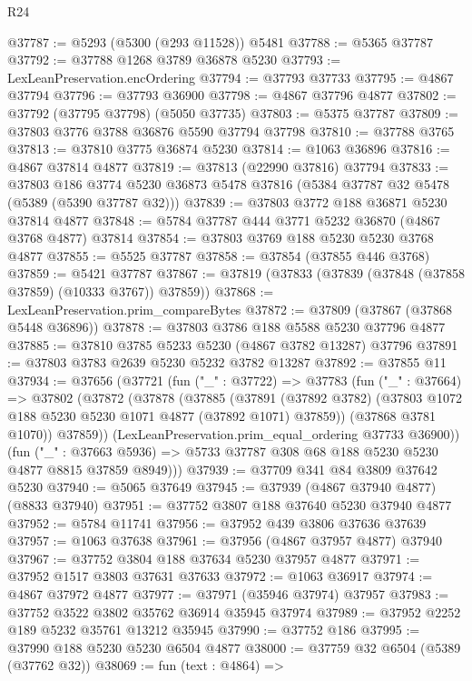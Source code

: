 \begin{lexlean}{R24}
\begin{coremodule}
@37787 := @5293 (@5300 (@293 @11528)) @5481
@37788 := @5365 @37787
@37792 := @37788 @1268 @3789 @36878 @5230
@37793 := LexLeanPreservation.encOrdering
@37794 := @37793 @37733
@37795 := @4867 @37794
@37796 := @37793 @36900
@37798 := @4867 @37796 @4877
@37802 := @37792 (@37795 @37798) (@5050 @37735)
@37803 := @5375 @37787
@37809 := @37803 @3776 @3788 @36876 @5590 @37794 @37798
@37810 := @37788 @3765
@37813 := @37810 @3775 @36874 @5230
@37814 := @1063 @36896
@37816 := @4867 @37814 @4877
@37819 := @37813 (@22990 @37816) @37794
@37833 := @37803
    @186
    @3774
    @5230
    @36873
    @5478
    @37816
    (@5384 @37787 @32 @5478 (@5389 (@5390 @37787 @32)))
@37839 := @37803 @3772 @188 @36871 @5230 @37814 @4877
@37848 := @5784 @37787 @444 @3771 @5232 @36870 (@4867 @3768 @4877) @37814
@37854 := @37803 @3769 @188 @5230 @5230 @3768 @4877
@37855 := @5525 @37787
@37858 := @37854 (@37855 @446 @3768)
@37859 := @5421 @37787
@37867 := @37819 (@37833 (@37839 (@37848 (@37858 @37859) (@10333 @3767)) @37859))
@37868 := LexLeanPreservation.prim_compareBytes
@37872 := @37809 (@37867 (@37868 @5448 @36896))
@37878 := @37803 @3786 @188 @5588 @5230 @37796 @4877
@37885 := @37810 @3785 @5233 @5230 (@4867 @3782 @13287) @37796
@37891 := @37803 @3783 @2639 @5230 @5232 @3782 @13287
@37892 := @37855 @11
@37934 := @37656
    (@37721
      (fun ("_" : @37722) =>
      @37783
        (fun ("_" : @37664) =>
        @37802
          (@37872
            (@37878
              (@37885
                (@37891
                  (@37892 @3782)
                  (@37803 @1072 @188 @5230 @5230 @1071 @4877 (@37892 @1071) @37859))
                (@37868 @3781 @1070))
              @37859))
          (LexLeanPreservation.prim_equal_ordering @37733 @36900))
        (fun ("_" : @37663 @5936) =>
        @5733 @37787 @308 @68 @188 @5230 @5230 @4877 @8815 @37859 @8949)))
@37939 := @37709 @341 @84 @3809 @37642 @5230
@37940 := @5065 @37649
@37945 := @37939 (@4867 @37940 @4877) (@8833 @37940)
@37951 := @37752 @3807 @188 @37640 @5230 @37940 @4877
@37952 := @5784 @11741
@37956 := @37952 @439 @3806 @37636 @37639
@37957 := @1063 @37638
@37961 := @37956 (@4867 @37957 @4877) @37940
@37967 := @37752 @3804 @188 @37634 @5230 @37957 @4877
@37971 := @37952 @1517 @3803 @37631 @37633
@37972 := @1063 @36917
@37974 := @4867 @37972 @4877
@37977 := @37971 (@35946 @37974) @37957
@37983 := @37752 @3522 @3802 @35762 @36914 @35945 @37974
@37989 := @37952 @2252 @189 @5232 @35761 @13212 @35945
@37990 := @37752 @186
@37995 := @37990 @188 @5230 @5230 @6504 @4877
@38000 := @37759 @32 @6504 (@5389 (@37762 @32))
@38069 := fun (text : @4864) =>

\end{coremodule}
\end{lexlean}
